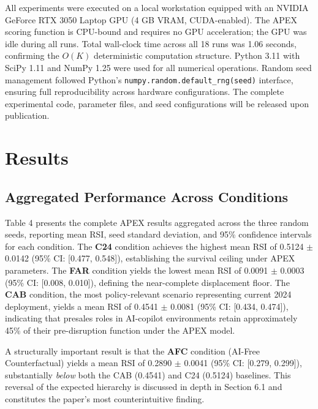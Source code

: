 \documentclass[10pt, conference]{IEEEtran}
\begin{document}
\label{sec:hardware_and_runtime}

All experiments were executed on a local workstation equipped with an NVIDIA GeForce RTX 3050 Laptop GPU (4 GB VRAM, CUDA-enabled). The APEX scoring function is CPU-bound and requires no GPU acceleration; the GPU was idle during all runs. Total wall-clock time across all 18 runs was 1.06 seconds, confirming the $O(K)$ deterministic computation structure. Python 3.11 with SciPy 1.11 \cite{virtanen2020scipy} and NumPy 1.25 were used for all numerical operations. Random seed management followed Python's \texttt{numpy.random.default\_rng(seed)} interface, ensuring full reproducibility across hardware configurations. The complete experimental code, parameter files, and seed configurations will be released upon publication.

\section{Results}

\label{sec:results}

\subsection{Aggregated Performance Across Conditions}

\label{sec:aggregated_performance_across_conditions}

Table 4 presents the complete APEX results aggregated across the three random seeds, reporting mean RSI, seed standard deviation, and 95\% confidence intervals for each condition. The \textbf{C24} condition achieves the highest mean RSI of 0.5124 $\pm$ 0.0142 (95\% CI: [0.477, 0.548]), establishing the survival ceiling under APEX parameters. The \textbf{FAR} condition yields the lowest mean RSI of 0.0091 $\pm$ 0.0003 (95\% CI: [0.008, 0.010]), defining the near-complete displacement floor. The \textbf{CAB} condition, the most policy-relevant scenario representing current 2024 deployment, yields a mean RSI of 0.4541 $\pm$ 0.0081 (95\% CI: [0.434, 0.474]), indicating that presales roles in AI-copilot environments retain approximately 45\% of their pre-disruption function under the APEX model.

A structurally important result is that the \textbf{AFC} condition (AI-Free Counterfactual) yields a mean RSI of 0.2890 $\pm$ 0.0041 (95\% CI: [0.279, 0.299]), substantially \textit{below} both the CAB (0.4541) and C24 (0.5124) baselines. This reversal of the expected hierarchy is discussed in depth in Section 6.1 and constitutes the paper's most counterintuitive finding.
\end{document}
